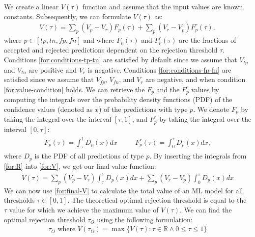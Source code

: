 %
%
We create a linear $V(\tau)$ function and assume that the input values are known constants.
%
Subsequently, we can formulate $V(\tau)$ as:
\begin{align}
    \label{for:V}
    V(\tau) = \sum_{p} (V_p - V_r)F_p(\tau) + \sum_{p} (V_r - V_p)F^r_{p}(\tau),
\end{align}
%
where $p \in [tp, tn, fp, fn]$ and where $F_p(\tau)$ and $F_p^r(\tau)$ are the fractions of accepted and rejected predictions dependent on the rejection threshold $\tau$.
%
Conditions \ref{for:conditions-tp-tn} are satisfied by default since we assume that $V_{tp}$ and $V_{tn}$ are positive and $V_r$ is negative.
%
Conditions \ref{for:conditions-fp-fn} are satisfied since we assume that $V_{fp}$, $V_{fn}$, and $V_r$ are negative, and when condition \ref{for:value-condition} holds.
% 
We can retrieve the $F_p$ and the $F_p^r$ values by computing the integrals over the probability density functions (PDF) of the confidence values (denoted as $x$) of the predictions with type $p$.
%
We denote $F_p$ by taking the integral over the interval $[\tau, 1]$, and $F_p^r$ by taking the integral over the interval $[0, \tau]$:
%
\begin{align}
    \label{for:R}
    \begin{aligned}
        F_{p}(\tau) = \int_\tau^1 D_p(x)dx & \quad & F_p^r(\tau) = \int_0^\tau D_p(x)dx,
    \end{aligned}
\end{align}
%
where $D_p$ is the PDF of all predictions of type $p$.
%
By inserting the integrals from \ref{for:R} into \ref{for:V}, we get our final value function:
%
\begin{align}
    \label{for:final-V}
    V(\tau) = \sum_p (V_p - V_r)\int_\tau^1 D_p(x)dx + \sum_p (V_r - V_p)\int_0^\tau D_p(x)dx
\end{align}
%
We can now use \ref{for:final-V} to calculate the total value of an  ML model for all thresholds $\tau \in [0, 1]$.
%
The theoretical optimal rejection threshold is equal to the $\tau$ value for which we achieve the maximum value of $V(\tau)$.
%
We can find the optimal rejection threshold $\tau_O$ using the following formulation:
%
\begin{align}
    \label{for:optimal-threshold}
    \tau_O \text{ where } V(\tau_O) = \max \{V(\tau): \tau \in \mathbb{R} \wedge 0 \leq \tau \leq 1 \}
\end{align}

